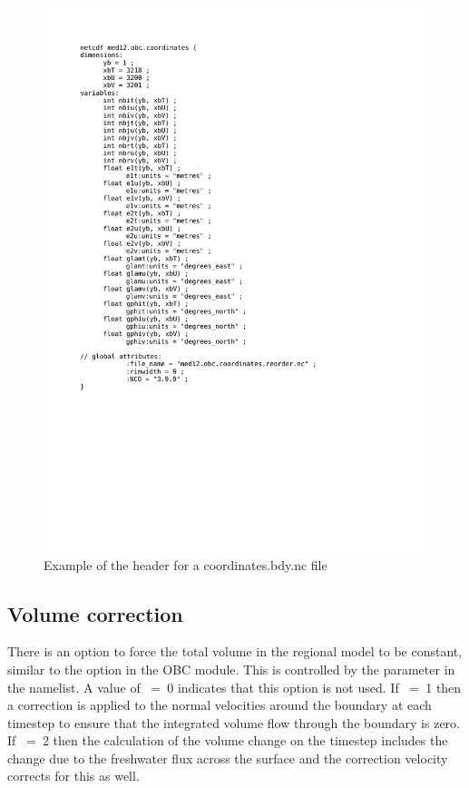 \begin{figure}[!t]     \begin{center}
\includegraphics[width=1.0\textwidth]{./TexFiles/Figures/Fig_LBC_nc_header.pdf}
\caption {     \label{Fig_LBC_nc_header} 
Example of the header for a coordinates.bdy.nc file}
\end{center}   \end{figure}

\subsection{Volume correction}
\label{BDY_vol_corr}

There is an option to force the total volume in the regional model to be constant, 
similar to the option in the OBC module. This is controlled  by the  
parameter in the namelist. A value of ~=~0 indicates that this option is not used. 
If  ~=~1 then a correction is applied to the normal velocities 
around the boundary at each timestep to ensure that the integrated volume flow 
through the boundary is zero. If ~=~2 then the calculation of 
the volume change on the timestep includes the change due to the freshwater 
flux across the surface and the correction velocity corrects for this as well.

